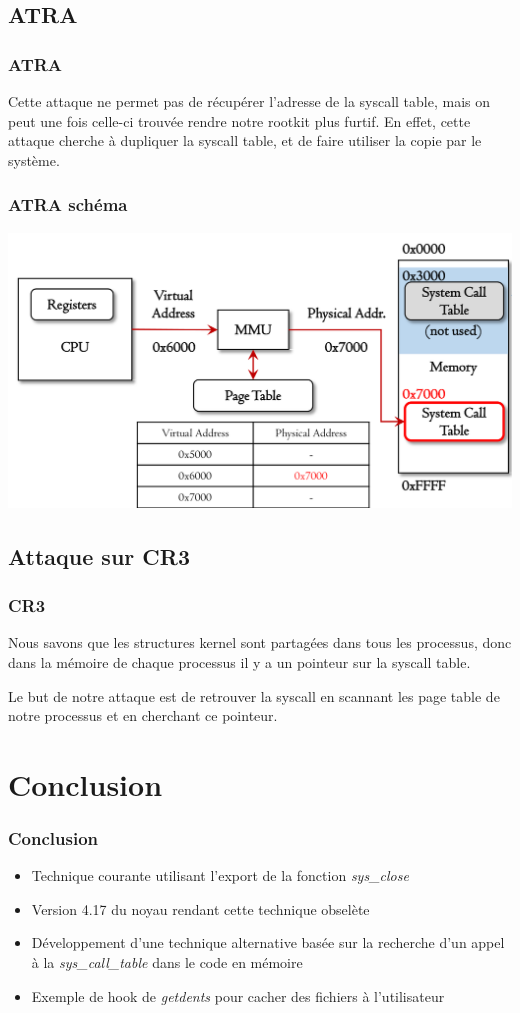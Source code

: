 \documentclass{beamer}
\begin{document}
\subsection{ATRA}
\begin{frame}
\frametitle{ATRA}
Cette attaque ne permet pas de récupérer l'adresse de la syscall table, mais on peut une fois celle-ci trouvée rendre notre rootkit plus furtif. En effet, cette attaque cherche à dupliquer la syscall table, et de faire utiliser la copie par le système.
\end{frame}
\begin{frame}
\frametitle{ATRA schéma}
\begin{center}
\includegraphics[scale=0.3]{./ATRA.png}
\end{center}
\end{frame}
\subsection{Attaque sur CR3}
\begin{frame}
\frametitle{CR3}
\begin{block}{}
Nous savons que les structures kernel sont partagées dans tous les processus, donc dans la mémoire de chaque processus il y a un pointeur sur la syscall table.
\end{block}
Le but de notre attaque est de retrouver la syscall en scannant les page table de notre processus et en cherchant ce pointeur.
\end{frame}

\section{Conclusion}
\begin{frame}[fragile]
\frametitle{Conclusion}
\begin{itemize}
\item 	Technique courante utilisant l'export de la fonction \textit{sys\_close}
\item 	Version 4.17 du noyau rendant cette technique obselète
\item 	Développement d'une technique alternative basée sur la recherche d'un appel à la \textit{sys\_call\_table} dans le code en mémoire
\item 	Exemple de hook de \textit{getdents} pour cacher des fichiers à l'utilisateur
\end{itemize}
\end{frame}
\end{document}
